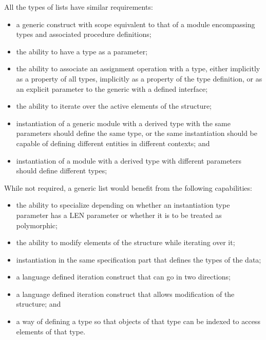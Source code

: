 \documentclass{article}
\newcounter{requirement}
\begin{document}
All the types of lists have similar requirements:
\begin{itemize}
\item a generic construct with scope equivalent to that of a module
  encompassing types and associated procedure definitions;

\item the ability to have a type as a parameter;

\item the ability to associate an assignment operation with a type, either
  implicitly as a property of all types, implicitly as a property of
  the type definition, or as an explicit parameter to the generic
  with a defined interface;

\item the ability to iterate over the active elements of the structure;

\item instantiation of a generic module with a derived type with the same
  parameters should define the same type, or the same instantiation
  should be capable of defining different entities in different
  contexts; and

\item instantiation of a module with a derived type with different
  parameters should define different types; 
\end{itemize}
While not required, a generic list would benefit from the
following capabilities:
\begin{itemize}

\item the ability to specialize depending on whether an instantiation
  type parameter has a LEN parameter or whether it is to be treated as
  polymorphic; 

\item the ability to modify elements of the structure while iterating
  over it; 

\item instantiation in the same specification part that defines the
  types of the data;

\item a language defined iteration construct that can go in two
  directions;

\item a language defined iteration construct that allows modification
  of the structure; and

\item a way of defining a type so that objects of that type can be
  indexed to access elements of that type.

\end{itemize}
\end{document}
